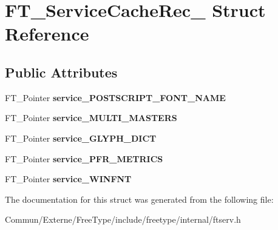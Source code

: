 \hypertarget{struct_f_t___service_cache_rec__}{}\section{F\+T\+\_\+\+Service\+Cache\+Rec\+\_\+ Struct Reference}
\label{struct_f_t___service_cache_rec__}
\subsection*{Public Attributes}
\begin{DoxyCompactItemize}
\item 
F\+T\+\_\+\+Pointer {\bfseries service\+\_\+\+P\+O\+S\+T\+S\+C\+R\+I\+P\+T\+\_\+\+F\+O\+N\+T\+\_\+\+N\+A\+ME}\hypertarget{struct_f_t___service_cache_rec___a1b95ee574621c8b031fe239d449bfa5c}{}\label{struct_f_t___service_cache_rec___a1b95ee574621c8b031fe239d449bfa5c}

\item 
F\+T\+\_\+\+Pointer {\bfseries service\+\_\+\+M\+U\+L\+T\+I\+\_\+\+M\+A\+S\+T\+E\+RS}\hypertarget{struct_f_t___service_cache_rec___abf51ac75b59eeac29ad5e4bbbc50e749}{}\label{struct_f_t___service_cache_rec___abf51ac75b59eeac29ad5e4bbbc50e749}

\item 
F\+T\+\_\+\+Pointer {\bfseries service\+\_\+\+G\+L\+Y\+P\+H\+\_\+\+D\+I\+CT}\hypertarget{struct_f_t___service_cache_rec___af8bbf442f497ad21666069ec33aaa88a}{}\label{struct_f_t___service_cache_rec___af8bbf442f497ad21666069ec33aaa88a}

\item 
F\+T\+\_\+\+Pointer {\bfseries service\+\_\+\+P\+F\+R\+\_\+\+M\+E\+T\+R\+I\+CS}\hypertarget{struct_f_t___service_cache_rec___ac5d029d7f442e8b727c40d5a88faa344}{}\label{struct_f_t___service_cache_rec___ac5d029d7f442e8b727c40d5a88faa344}

\item 
F\+T\+\_\+\+Pointer {\bfseries service\+\_\+\+W\+I\+N\+F\+NT}\hypertarget{struct_f_t___service_cache_rec___abb824452cfb20932fbd22405323781f9}{}\label{struct_f_t___service_cache_rec___abb824452cfb20932fbd22405323781f9}

\end{DoxyCompactItemize}


The documentation for this struct was generated from the following file\+:\begin{DoxyCompactItemize}
\item 
Commun/\+Externe/\+Free\+Type/include/freetype/internal/ftserv.\+h\end{DoxyCompactItemize}
